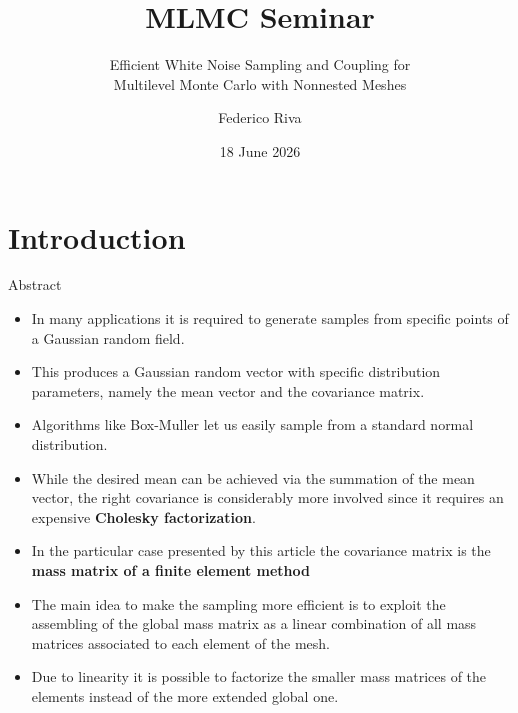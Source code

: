 \documentclass[
  english,            %
  aspectratio=169,    %
]{tumbeamer}
\title{MLMC Seminar}
\subtitle{Efficient White Noise Sampling and Coupling for\\ Multilevel Monte Carlo with Nonnested Meshes}
\author{Federico Riva}
\institute{Department of Mathematics\\\theUniversityName}
\date[18 June 2026]{18 June 2026}
\begin{document}
\maketitle

\section{Introduction}

\begin{frame}{Abstract}
\begin{itemize}
\item In many applications it is required to generate samples from specific points of a Gaussian
random field.
\bigskip
\item This produces a Gaussian random vector with specific distribution parameters, namely the mean vector and the covariance matrix.
\bigskip
\item Algorithms like Box-Muller let us easily sample from a standard normal distribution.
\bigskip
\item While the desired mean can be achieved via the summation of the mean vector, the right covariance is considerably more involved since it requires an expensive \textbf{Cholesky factorization}.
\end{itemize}

\end{frame}

\begin{frame}{}
\bigskip
\begin{itemize}
\bigskip
\bigskip
\item  In the particular case presented by this article the covariance matrix is the \textbf{mass matrix of a finite element method}
\bigskip
\item The main idea to make the sampling more
efficient is to exploit the assembling of the global mass matrix as a linear combination of
all mass matrices associated to each element of the mesh.
\bigskip
\item Due to linearity it is possible to
factorize the smaller mass matrices of the elements instead of the more extended global one.
\end{itemize}

\end{frame}

\end{document}
